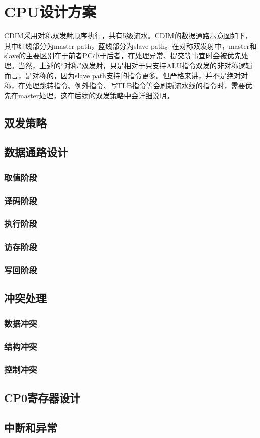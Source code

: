 \chapter{CPU设计方案}

CDIM采用对称双发射顺序执行，共有5级流水。CDIM的数据通路示意图如下，其中红线部分为master path，蓝线部分为slave path。在对称双发射中，master和slave的主要区别在于前者PC小于后者，在处理异常、提交等事宜时会被优先处理。当然，上述的“对称”双发射，只是相对于只支持ALU指令双发的非对称逻辑而言，是对称的，因为slave path支持的指令更多。但严格来讲，并不是绝对对称，在处理跳转指令、例外指令、写TLB指令等会刷新流水线的指令时，需要优先在master处理，这在后续的双发策略中会详细说明。

\section{双发策略}


\section{数据通路设计}
\subsection{取值阶段}
\subsection{译码阶段}
\subsection{执行阶段}
\subsection{访存阶段}
\subsection{写回阶段}

\section{冲突处理}
\subsection{数据冲突}
\subsection{结构冲突}
\subsection{控制冲突}

\section{CP0寄存器设计}

\section{中断和异常}

